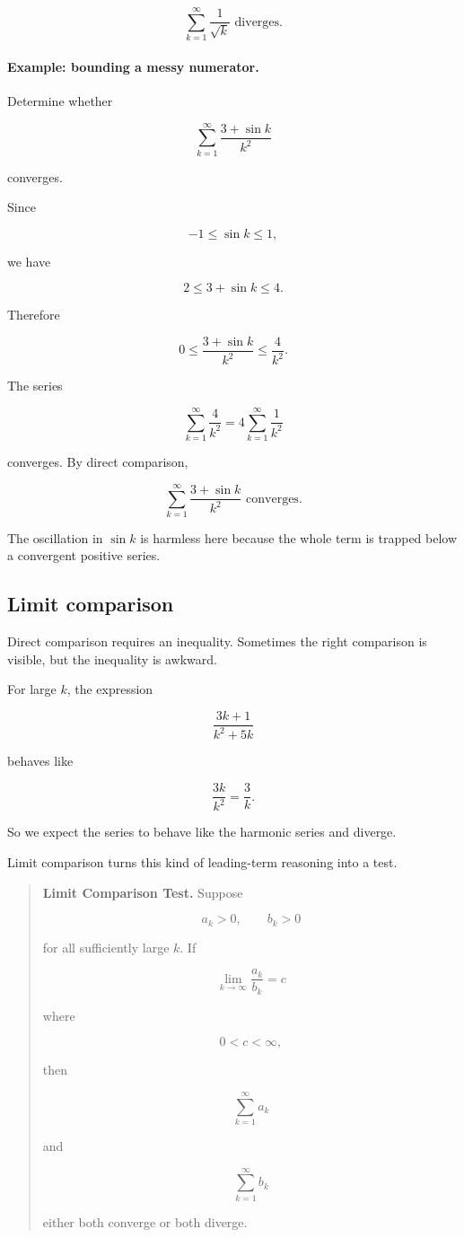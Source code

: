 \[
\boxed{
\sum_{k=1}^{\infty}\frac1{\sqrt{k}} \text{ diverges.}
}
\]

\paragraph{Example: bounding a messy numerator.}
Determine whether

\[
\sum_{k=1}^{\infty}\frac{3+\sin k}{k^2}
\]

converges.

Since

\[
-1\le \sin k\le1,
\]

we have

\[
2\le 3+\sin k\le4.
\]

Therefore

\[
0\le \frac{3+\sin k}{k^2}\le \frac4{k^2}.
\]

The series

\[
\sum_{k=1}^{\infty}\frac4{k^2}=4\sum_{k=1}^{\infty}\frac1{k^2}
\]

converges.  By direct comparison,

\[
\boxed{
\sum_{k=1}^{\infty}\frac{3+\sin k}{k^2} \text{ converges.}
}
\]

The oscillation in \(\sin k\) is harmless here because the whole term is trapped below a
convergent positive series.

\subsection{Limit comparison}
\label{subsec:limit-comparison-test}

Direct comparison requires an inequality.  Sometimes the right comparison is visible,
but the inequality is awkward.

For large \(k\), the expression

\[
\frac{3k+1}{k^2+5k}
\]

behaves like

\[
\frac{3k}{k^2}=\frac3k.
\]

So we expect the series to behave like the harmonic series and diverge.

Limit comparison turns this kind of leading-term reasoning into a test.

\begin{quote}
\textbf{Limit Comparison Test.}
Suppose

\[
a_k>0,
\qquad
b_k>0
\]

for all sufficiently large \(k\).  If

\[
\lim_{k\to\infty}\frac{a_k}{b_k}=c
\]

where

\[
0<c<\infty,
\]

then

\[
\sum_{k=1}^{\infty}a_k
\]

and

\[
\sum_{k=1}^{\infty}b_k
\]

either both converge or both diverge.
\end{quote}


